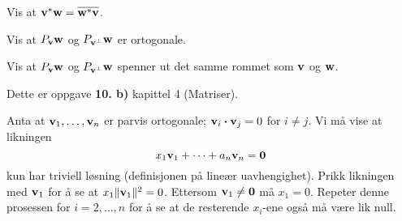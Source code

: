 \begin{oppgave}
Vis at $\mathbf{v}^* \mathbf{w}=\overline{\mathbf{w}^* \mathbf{v}}$.
\end{oppgave}

\begin{oppgave}
Vis at $P_{\mathbf{v}}\mathbf{w}$ og $P_{\mathbf{v}^{\perp}}\mathbf{w}$ er ortogonale.
\end{oppgave}


\begin{losning}
\end{losning}


\begin{oppgave}
Vis at $P_{\mathbf{v}}\mathbf{w}$ og $P_{\mathbf{v}^{\perp}}\mathbf{w}$ spenner ut det samme rommet som $\mathbf{v}$ og $\mathbf{w}$.
\end{oppgave}




\begin{losning}
\begin{punkt}
Dette er oppgave \textbf{10. b)} kapittel 4 (Matriser).
\end{punkt}
\begin{punkt}
Anta at $\mathbf{v}_1,\dots,\mathbf{v}_n$ er parvis ortogonale; $\mathbf{v}_i\boldsymbol{\cdot}\mathbf{v}_j=0$ for $i\neq j$. Vi må vise at likningen $$x_1\mathbf{v}_1+\dots+a_n\mathbf{v}_n=\mathbf{0}$$ kun har triviell løsning (definisjonen på lineær uavhengighet). Prikk likningen med $\mathbf{v}_1$ for å se at $x_1\|\mathbf{v}_1\|^2=0$. Ettersom $\mathbf{v}_1\neq \mathbf{0}$ må $x_1=0$. Repeter denne prosessen for $i=2,\dots,n$ for å se at de resterende $x_i$-ene også må være lik null.
\end{punkt}
\end{losning}

